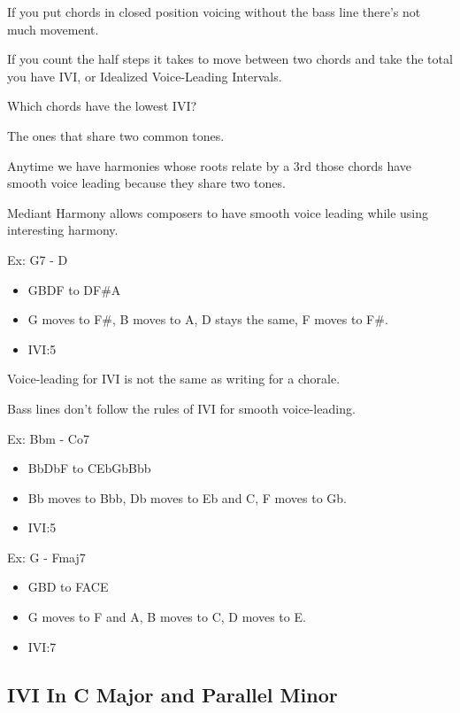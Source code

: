 \documentclass{book}
\begin{document}
If you put chords in closed position voicing without the bass line there's not
much movement.

If you count the half steps it takes to move between two chords and take the
total you have IVI, or Idealized Voice-Leading Intervals.

Which chords have the lowest IVI?

The ones that share two common tones.

Anytime we have harmonies whose roots relate by a 3rd those chords have smooth
voice leading because they share two tones.

Mediant Harmony allows composers to have smooth voice leading while using
interesting harmony.

Ex: G7 - D

\begin{itemize}
\item
  GBDF to DF\#A
\item
  G moves to F\#, B moves to A, D stays the same, F moves to F\#.
\item
  IVI:5
\end{itemize}

Voice-leading for IVI is not the same as writing for a chorale.

Bass lines don't follow the rules of IVI for smooth voice-leading.

Ex: Bbm - Co7

\begin{itemize}
\item
  BbDbF to CEbGbBbb
\item
  Bb moves to Bbb, Db moves to Eb and C, F moves to Gb.
\item
  IVI:5
\end{itemize}

Ex: G - Fmaj7

\begin{itemize}
\item
  GBD to FACE
\item
  G moves to F and A, B moves to C, D moves to E.
\item
  IVI:7
\end{itemize}

\hypertarget{ivi-in-c-major-and-parallel-minor}{%
\subsection{IVI In C Major and Parallel
Minor}\label{ivi-in-c-major-and-parallel-minor}}
\end{document}
